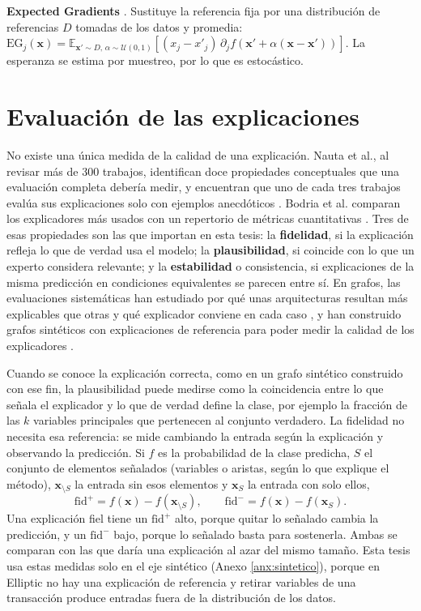 \textbf{Expected Gradients} \cite{Erion2021Expected}. Sustituye la referencia fija por una
distribución de referencias $D$ tomadas de los datos y promedia:
$\mathrm{EG}_j(\mathbf{x}) = \mathbb{E}_{\mathbf{x}' \sim D,\, \alpha \sim \mathcal{U}(0,1)}
\left[(x_j - x'_j)\, \partial_j f(\mathbf{x}' + \alpha(\mathbf{x} - \mathbf{x}'))\right]$.
La esperanza se estima por muestreo, por lo que es estocástico.

\section{Evaluación de las explicaciones}

No existe una única medida de la calidad de una explicación. Nauta et al., al revisar más de 300 trabajos, identifican doce propiedades conceptuales que una evaluación completa debería medir, y encuentran que uno de cada tres trabajos evalúa sus explicaciones solo con ejemplos anecdóticos \cite{Nauta2023Anecdotal}. Bodria et al. comparan los explicadores más usados con un repertorio de métricas cuantitativas \cite{Bodria2023Benchmarking}. Tres de esas propiedades son las que importan en esta tesis: la
\textbf{fidelidad}, si la explicación refleja lo que de verdad usa el modelo; la
\textbf{plausibilidad}, si coincide con lo que un experto considera relevante; y la
\textbf{estabilidad} o consistencia, si explicaciones de la misma predicción en condiciones
equivalentes se parecen entre sí. En grafos, las evaluaciones sistemáticas han estudiado por qué unas arquitecturas resultan más explicables que otras y qué explicador conviene en cada caso \cite{Longa2024Explaining}, y han construido grafos sintéticos con explicaciones de referencia para poder medir la calidad de los explicadores \cite{Agarwal2023Evaluating}.

Cuando se conoce la explicación correcta, como en un grafo sintético construido con ese fin, la
plausibilidad puede medirse como la coincidencia entre lo que señala el explicador y lo que de
verdad define la clase, por ejemplo la fracción de las $k$ variables principales que pertenecen
al conjunto verdadero. La fidelidad no necesita esa referencia: se mide cambiando la entrada
según la explicación y observando la predicción. Si $f$ es la probabilidad de la clase predicha,
$S$ el conjunto de elementos señalados (variables o aristas, según lo que explique el método),
$\mathbf{x}_{\setminus S}$ la entrada sin esos elementos y $\mathbf{x}_{S}$ la entrada con solo
ellos,
\begin{equation}
  \mathrm{fid}^{+} = f(\mathbf{x}) - f(\mathbf{x}_{\setminus S}), \qquad
  \mathrm{fid}^{-} = f(\mathbf{x}) - f(\mathbf{x}_{S}).
\end{equation}
Una explicación fiel tiene un $\mathrm{fid}^{+}$ alto, porque quitar lo señalado cambia la
predicción, y un $\mathrm{fid}^{-}$ bajo, porque lo señalado basta para sostenerla. Ambas se
comparan con las que daría una explicación al azar del mismo tamaño. Esta tesis usa estas medidas
solo en el eje sintético (Anexo \ref{anx:sintetico}), porque en Elliptic no hay una explicación
de referencia y retirar variables de una transacción produce entradas fuera de la distribución
de los datos.


